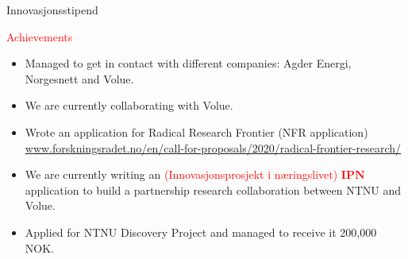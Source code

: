 \documentclass[12pt]{beamer}
\begin{document}
\begin{frame}{Innovasjonsstipend}
{\begin{alertblock}{\textcolor{red}{Achievements}}
\begin{itemize}
\item<1-> Managed to get in contact with different companies: Agder Energi, Norgesnett and Volue.
\item<2-> We are currently collaborating with Volue.
\item<3-> Wrote an application for Radical Research Frontier (NFR application) \textcolor{blue}{\url{www.forskningsradet.no/en/call-for-proposals/2020/radical-frontier-research/}}
\item<4-> We are currently writing an \textcolor{red}{(Innovasjonsprosjekt  i  næringslivet) $\boldsymbol{IPN}$} application to build a partnership research collaboration between NTNU and Volue.
\item<5-> Applied for NTNU Discovery Project and managed to receive it 200,000 NOK. 
\end{itemize}
\end{alertblock}}
\end{frame}
\end{document}
